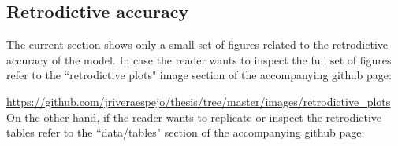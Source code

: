 \newpage
\subsection{Retrodictive accuracy} \label{sub_sect:retro_accuracy}

The current section shows only a small set of figures related to the retrodictive accuracy of the model. In case the reader wants to inspect the full set of figures refer to the ``retrodictive plots" image section of the accompanying github page:

\noindent \url{https://github.com/jriveraespejo/thesis/tree/master/images/retrodictive_plots} \\


On the other hand, if the reader wants to replicate or inspect the retrodictive tables refer to the ``data/tables" section of the accompanying github page:

